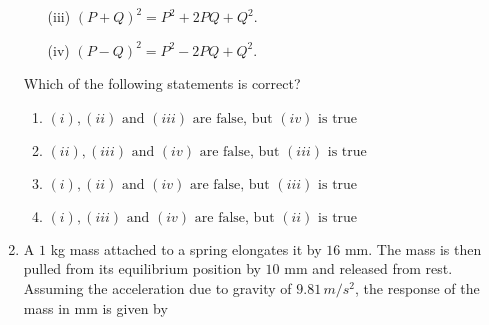 \documentclass[journal]{IEEEtran}
\numberwithin{equation}{enumi}
\numberwithin{figure}{enumi}
\begin{document}
\begin{enumerate}
\begin{enumerate}
    \item[(iii)] $(P + Q)^2 = P^2 + 2PQ + Q^2$.
    \item[(iv)] $(P - Q)^2 = P^2 - 2PQ + Q^2$.
\end{enumerate}
Which of the following statements is correct?
    \begin{enumerate}
        \item $ (i), (ii) \text{ and } (iii) \text{ are false, but } (iv) \text{ is true} $
        \item $ (ii), (iii) \text{ and } (iv) \text{ are false, but } (iii) \text{ is true} $
        \item $ (i), (ii) \text{ and } (iv) \text{ are false, but } (iii) \text{ is true} $
        \item $ (i), (iii) \text{ and } (iv) \text{ are false, but } (ii) \text{ is true} $
    \end{enumerate}
\bigskip
\item A $1$ kg mass attached to a spring elongates it by $16$ mm. The mass is then pulled from its equilibrium position by $10$ mm and released from rest. Assuming the acceleration due to gravity of $9.81 \, m/s^2$, the response of the mass in mm is given by


\end{enumerate}
\end{document}
